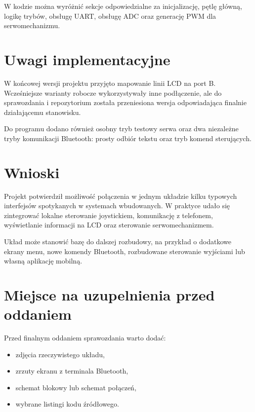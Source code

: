 \documentclass[a4paper,12pt]{article}
\begin{document}
W kodzie można wyróżnić sekcje odpowiedzialne za inicjalizację, pętlę główną, logikę trybów, obsługę UART, obsługę ADC oraz generację PWM dla serwomechanizmu.

\section{Uwagi implementacyjne}

W końcowej wersji projektu przyjęto mapowanie linii LCD na port B. Wcześniejsze warianty robocze wykorzystywały inne podłączenie, ale do sprawozdania i repozytorium została przeniesiona wersja odpowiadająca finalnie działającemu stanowisku.

Do programu dodano również osobny tryb testowy serwa oraz dwa niezależne tryby komunikacji Bluetooth: prosty odbiór tekstu oraz tryb komend sterujących.

\section{Wnioski}

Projekt potwierdził możliwość połączenia w jednym układzie kilku typowych interfejsów spotykanych w systemach wbudowanych. W praktyce udało się zintegrować lokalne sterowanie joystickiem, komunikację z telefonem, wyświetlanie informacji na LCD oraz sterowanie serwomechanizmem.

Układ może stanowić bazę do dalszej rozbudowy, na przykład o dodatkowe ekrany menu, nowe komendy Bluetooth, rozbudowane sterowanie wyjściami lub własną aplikację mobilną.

\section*{Miejsce na uzupelnienia przed oddaniem}

Przed finalnym oddaniem sprawozdania warto dodać:

\begin{itemize}[leftmargin=1.2cm]
    \item zdjęcia rzeczywistego układu,
    \item zrzuty ekranu z terminala Bluetooth,
    \item schemat blokowy lub schemat połączeń,
    \item wybrane listingi kodu źródłowego.
\end{itemize}
\end{document}

